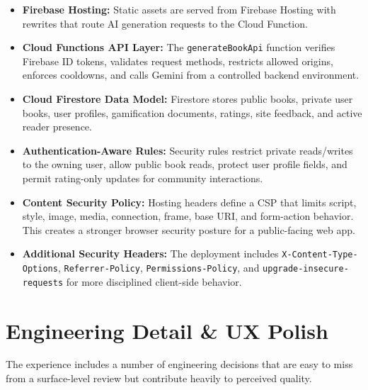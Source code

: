 \documentclass[11pt, a4paper]{article}
\begin{document}
\begin{itemize}[label=\textcolor{abookigold}{\textbullet}]
    \item \textbf{Firebase Hosting:} Static assets are served from Firebase Hosting with rewrites that route AI generation requests to the Cloud Function.
    \item \textbf{Cloud Functions API Layer:} The \texttt{generateBookApi} function verifies Firebase ID tokens, validates request methods, restricts allowed origins, enforces cooldowns, and calls Gemini from a controlled backend environment.
    \item \textbf{Cloud Firestore Data Model:} Firestore stores public books, private user books, user profiles, gamification documents, ratings, site feedback, and active reader presence.
    \item \textbf{Authentication-Aware Rules:} Security rules restrict private reads/writes to the owning user, allow public book reads, protect user profile fields, and permit rating-only updates for community interactions.
    \item \textbf{Content Security Policy:} Hosting headers define a CSP that limits script, style, image, media, connection, frame, base URI, and form-action behavior. This creates a stronger browser security posture for a public-facing web app.
    \item \textbf{Additional Security Headers:} The deployment includes \texttt{X-Content-Type-Options}, \texttt{Referrer-Policy}, \texttt{Permissions-Policy}, and \texttt{upgrade-insecure-requests} for more disciplined client-side behavior.
\end{itemize}

\section{Engineering Detail \& UX Polish}
The experience includes a number of engineering decisions that are easy to miss from a surface-level review but contribute heavily to perceived quality.
\end{document}
